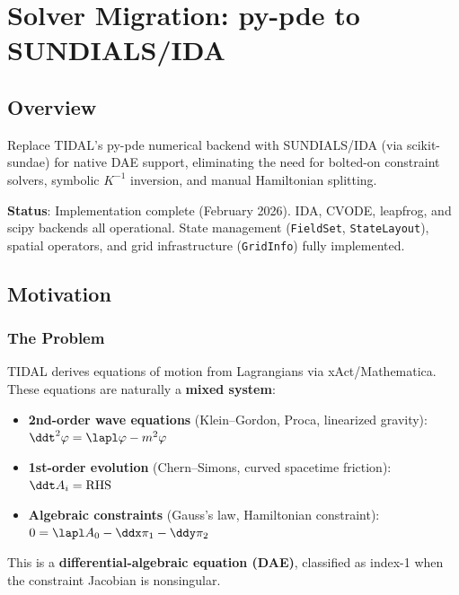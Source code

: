 
\section{Solver Migration: py-pde to SUNDIALS/IDA}
\label{sec:solver-migration}

\subsection{Overview}

Replace TIDAL's py-pde numerical backend with SUNDIALS/IDA (via scikit-sundae)
for native DAE support, eliminating the need for bolted-on constraint solvers,
symbolic $K^{-1}$ inversion, and manual Hamiltonian splitting.

\textbf{Status}: Implementation complete (February 2026). IDA, CVODE, leapfrog, and scipy backends all operational. State management (\texttt{FieldSet}, \texttt{StateLayout}), spatial operators, and grid infrastructure (\texttt{GridInfo}) fully implemented.

\subsection{Motivation}
\label{sec:migration-motivation}

\subsubsection{The Problem}
\label{sec:migration-problem}

TIDAL derives equations of motion from Lagrangians via xAct/Mathematica. These
equations are naturally a \textbf{mixed system}:

\begin{itemize}
  \item \textbf{2nd-order wave equations} (Klein--Gordon, Proca, linearized gravity):
    $\ddt^2 \varphi = \lapl\varphi - m^2\varphi$
  \item \textbf{1st-order evolution} (Chern--Simons, curved spacetime friction):
    $\ddt A_i = \mathrm{RHS}$
  \item \textbf{Algebraic constraints} (Gauss's law, Hamiltonian constraint):
    $0 = \lapl A_0 - \ddx \pi_1 - \ddy \pi_2$
\end{itemize}

This is a \textbf{differential-algebraic equation (DAE)}, classified as index-1 when
the constraint Jacobian is nonsingular.

